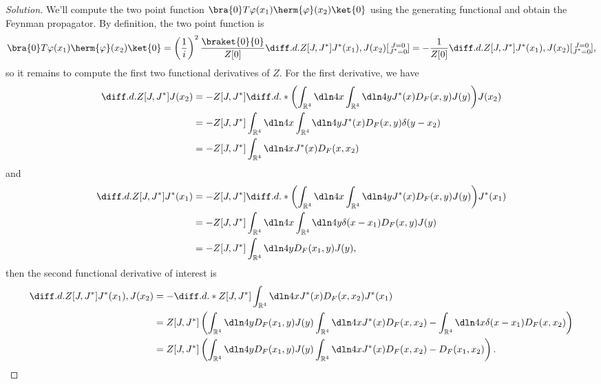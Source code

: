 \begin{proof}[Solution]
    We'll compute the two point function \(\bra{0} T \varphi(x_1) \herm{\varphi}(x_2) \ket{0}\) using the generating functional and obtain the Feynman propagator. By definition, the two point function is
    \begin{equation*}
        \bra{0} T \varphi(x_1) \herm{\varphi}(x_2) \ket{0} = \left(\frac1i\right)^2 \frac{\braket{0}{0}}{Z[0]}\diff.d.{Z[J, J^*]}{J^*(x_1),J(x_2)}[\substack{J = 0\\J^* = 0}] = - \frac{1}{Z[0]} \diff.d.{Z[J,J^*]}{J^*(x_1),J(x_2)}[\substack{J = 0\\J^*=0}],
    \end{equation*}
    so it remains to compute the first two functional derivatives of \(Z.\) For the first derivative, we have
    \begin{align*}
        \diff.d.{Z[J, J^*]}{J(x_2)} &= - Z[J, J^*] \diff.d.*{\left(\int_{\mathbb{R}^4} \dln4x \int_{\mathbb{R}^4} \dln4y J^*(x) D_F(x,y) J(y)\right)}{J(x_2)}\\
                                    &= - Z[J, J^*] \int_{\mathbb{R}^4} \dln4x \int_{\mathbb{R}^4} \dln4y J^*(x)D_F(x,y) \delta(y - x_2)\\
                                    &= - Z[J, J^*] \int_{\mathbb{R}^4} \dln4x  J^*(x) D_F(x, x_2)
    \end{align*}
    and
    \begin{align*}
        \diff.d.{Z[J, J^*]}{J^*(x_1)} &= - Z[J, J^*] \diff.d.*{\left(\int_{\mathbb{R}^4} \dln4x \int_{\mathbb{R}^4} \dln4y J^*(x) D_F(x,y) J(y)\right)}{J^*(x_1)}\\
                                    &= - Z[J, J^*] \int_{\mathbb{R}^4} \dln4x \int_{\mathbb{R}^4} \dln4y \delta(x - x_1)D_F(x,y) J(y)\\
                                    &= - Z[J, J^*] \int_{\mathbb{R}^4} \dln4y  D_F(x_1, y) J(y),
    \end{align*}
    then the second functional derivative of interest is
    \begin{align*}
        \diff.d.{Z[J,J^*]}{J^*(x_1),J(x_2)} &= -\diff.d.*{Z[J,J^*] \int_{\mathbb{R}^4} \dln4x J^*(x) D_F(x, x_2)}{J^*(x_1)}\\
                                           &= Z[J, J^*] \left(\int_{\mathbb{R}^4} \dln4y D_F(x_1,y) J(y) \int_{\mathbb{R}^4} \dln4x J^*(x) D_F(x, x_2) - \int_{\mathbb{R}^4} \dln4x \delta(x - x_1) D_F(x, x_2)\right)\\
                                           &= Z[J, J^*] \left(\int_{\mathbb{R}^4} \dln4y D_F(x_1,y) J(y) \int_{\mathbb{R}^4} \dln4x J^*(x) D_F(x, x_2) - D_F(x_1, x_2)\right).

\end{align*}
\end{proof}
